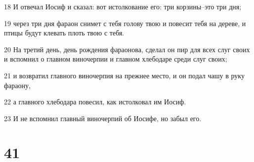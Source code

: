 \par 18 И отвечал Иосиф и сказал: вот истолкование его: три корзины--это три дня;
\par 19 через три дня фараон снимет с тебя голову твою и повесит тебя на дереве, и птицы будут клевать плоть твою с тебя.
\par 20 На третий день, день рождения фараонова, сделал он пир для всех слуг своих и вспомнил о главном виночерпии и главном хлебодаре среди слуг своих;
\par 21 и возвратил главного виночерпия на прежнее место, и он подал чашу в руку фараону,
\par 22 а главного хлебодара повесил, как истолковал им Иосиф.
\par 23 И не вспомнил главный виночерпий об Иосифе, но забыл его.

\chapter{41}

